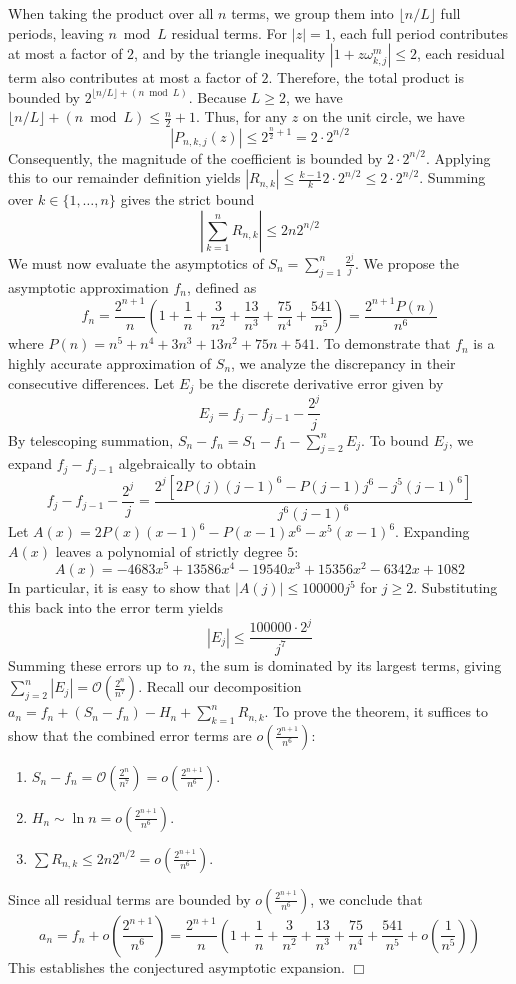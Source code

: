 When taking the product over all $n$ terms, we group them into $\lfloor n/L \rfloor$ full periods, leaving $n \bmod L$ residual terms. For $|z|=1$, each full period contributes at most a factor of $2$, and by the triangle inequality $|1 + z \omega_{k,j}^m| \le 2$, each residual term also contributes at most a factor of $2$. Therefore, the total product is bounded by $2^{\lfloor n/L \rfloor + (n \bmod L)}$. 
Because $L \ge 2$, we have $\lfloor n/L \rfloor + (n \bmod L) \le \frac{n}{2} + 1$. Thus, for any $z$ on the unit circle, we have
$$ |P_{n, k, j}(z)| \le 2^{\frac{n}{2} + 1} = 2 \cdot 2^{n/2} $$
Consequently, the magnitude of the coefficient is bounded by $2 \cdot 2^{n/2}$. Applying this to our remainder definition yields $|R_{n,k}| \le \frac{k-1}{k} 2 \cdot 2^{n/2} \le 2 \cdot 2^{n/2}$. Summing over $k \in \{1, \dots, n\}$ gives the strict bound
$$ \left| \sum_{k=1}^n R_{n,k} \right| \le 2 n 2^{n/2} $$
We must now evaluate the asymptotics of $S_n = \sum_{j=1}^n \frac{2^j}{j}$. We propose the asymptotic approximation $f_n$, defined as
$$ f_n = \frac{2^{n+1}}{n} \left( 1 + \frac{1}{n} + \frac{3}{n^2} + \frac{13}{n^3} + \frac{75}{n^4} + \frac{541}{n^5} \right) = \frac{2^{n+1} P(n)}{n^6} $$
where $P(n) = n^5 + n^4 + 3n^3 + 13n^2 + 75n + 541$. 
To demonstrate that $f_n$ is a highly accurate approximation of $S_n$, we analyze the discrepancy in their consecutive differences. Let $E_j$ be the discrete derivative error given by
$$ E_j = f_j - f_{j-1} - \frac{2^j}{j} $$
By telescoping summation, $S_n - f_n = S_1 - f_1 - \sum_{j=2}^n E_j$. To bound $E_j$, we expand $f_j - f_{j-1}$ algebraically to obtain
$$ f_j - f_{j-1} - \frac{2^j}{j} = \frac{2^j \left[ 2P(j)(j-1)^6 - P(j-1)j^6 - j^5(j-1)^6 \right]}{j^6(j-1)^6} $$
Let $A(x) = 2P(x)(x-1)^6 - P(x-1)x^6 - x^5(x-1)^6$. Expanding $A(x)$ leaves a polynomial of strictly degree $5$:
$$ A(x) = -4683 x^5 + 13586 x^4 - 19540 x^3 + 15356 x^2 - 6342 x + 1082 $$
In particular, it is easy to show that $|A(j)| \le 100000 j^5$ for $j \geq 2$. Substituting this back into the error term yields
$$ |E_j| \le \frac{100000 \cdot 2^j}{j^7} $$
Summing these errors up to $n$, the sum is dominated by its largest terms, giving $\sum_{j=2}^n |E_j| = \mathcal{O}\left(\frac{2^n}{n^7}\right)$. 
Recall our decomposition $a_n = f_n + (S_n - f_n) - H_n + \sum_{k=1}^n R_{n,k}$. To prove the theorem, it suffices to show that the combined error terms are $o\left(\frac{2^{n+1}}{n^6}\right)$:
\begin{enumerate}
    \item $S_n - f_n = \mathcal{O}\left(\frac{2^n}{n^7}\right) = o\left(\frac{2^{n+1}}{n^6}\right)$.
    \item $H_n \sim \ln n = o\left(\frac{2^{n+1}}{n^6}\right)$.
    \item $\sum R_{n,k} \le 2n 2^{n/2} = o\left(\frac{2^{n+1}}{n^6}\right)$.
\end{enumerate}
Since all residual terms are bounded by $o\left(\frac{2^{n+1}}{n^6}\right)$, we conclude that
$$ a_n = f_n + o\left(\frac{2^{n+1}}{n^6}\right) = \frac{2^{n+1}}{n} \left( 1 + \frac{1}{n} + \frac{3}{n^2} + \frac{13}{n^3} + \frac{75}{n^4} + \frac{541}{n^5} + o\left(\frac{1}{n^5}\right) \right)$$
This establishes the conjectured asymptotic expansion. \hfill $\Box$
